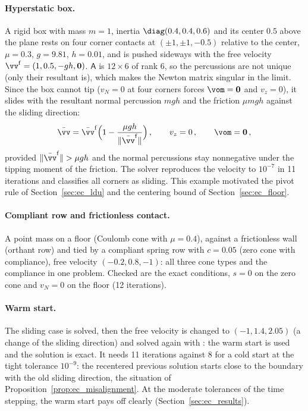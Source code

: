 \paragraph{Hyperstatic box.} A rigid box with mass $m = 1$, inertia $\diag(0.4, 0.4, 0.6)$ and its center $0.5$ above the plane rests on four corner contacts at $(\pm 1, \pm 1, -0.5)$ relative to the center, $\mu = 0.3$, $g = 9.81$, $h = 0.01$, and is pushed sideways with the free velocity $\vv^\mathrm{f} = (1, 0.5, -gh, \mathbf{0})$. $\mathsf{A}$ is $12 \times 6$ of rank 6, so the percussions are not unique (only their resultant is), which makes the Newton matrix singular in the limit. Since the box cannot tip ($v_N = 0$ at four corners forces $\vom = \mathbf{0}$ and $v_z = 0$), it slides with the resultant normal percussion $m g h$ and the friction $\mu m g h$ against the sliding direction:
%
\begin{equation}
	\bar{\vv} = \bar{\vv}^\mathrm{f}\Big(1 - \frac{\mu g h}{\|\bar{\vv}^\mathrm{f}\|}\Big) \, , \qquad v_z = 0 \, , \qquad \vom = \mathbf{0} \, ,
\end{equation}
%
provided $\|\bar{\vv}^\mathrm{f}\| > \mu g h$ and the normal percussions stay nonnegative under the tipping moment of the friction. The solver reproduces the velocity to $10^{-7}$ in 11 iterations and classifies all corners as sliding. This example motivated the pivot rule of Section~\ref{sec:ec_ldu} and the centering bound of Section~\ref{sec:ec_floor}.
%
\paragraph{Compliant row and frictionless contact.} A point mass on a floor (Coulomb cone with $\mu = 0.4$), against a frictionless wall (orthant row) and tied by a compliant spring row with $c = 0.05$ (zero cone with compliance), free velocity $(-0.2, 0.8, -1)$: all three cone types and the compliance in one problem. Checked are the exact conditions, $s = 0$ on the zero cone and $v_N = 0$ on the floor (12 iterations).
%
\paragraph{Warm start.} The sliding case is solved, then the free velocity is changed to $(-1, 1.4, 2.05)$ (a change of the sliding direction) and solved again with : the warm start is used and the solution is exact. It needs 11 iterations against 8 for a cold start at the tight tolerance $10^{-9}$: the recentered previous solution starts close to the boundary with the old sliding direction, the situation of Proposition~\ref{prop:ec_misalignment}. At the moderate tolerances of the time stepping, the warm start pays off clearly (Section~\ref{sec:ec_results}).
%
